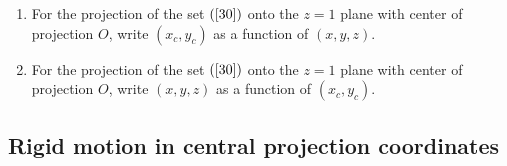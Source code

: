 \documentclass{ximera}
\begin{document}
\begin{exercise}\label{31}\hfil
\begin{enumerate}
\item  For the projection of the set $\left(  \ref{30}\right)  $ onto
the $z=1$ plane with center of projection $O$, write $\left(  x_{c}%
,y_{c}\right)  $ as a function of $\left(  x,y,z\right)  $.

\item For the projection of the set $\left(  \ref{30}\right)  $ onto the $z=1$
plane with center of projection $O$, write $\left(  x,y,z\right)  $ as a
function of $\left(  x_{c},y_{c}\right)  $.
\end{enumerate}
\end{exercise}

\subsection*{Rigid motion in central projection coordinates}
\end{document}
